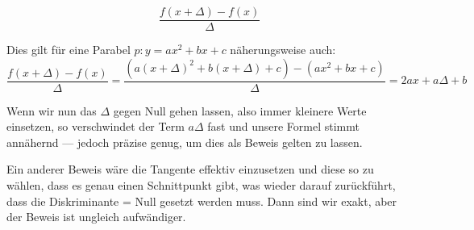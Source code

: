 
$$\frac{f(x+\Delta) - f(x)}{\Delta}$$

Dies gilt für eine Parabel $p: y=ax^2+bx+c$ näherungsweise auch:
$$\frac{f(x+\Delta)-f(x)}{\Delta} = \frac{(a(x+\Delta)^2 + b(x+\Delta)
  + c) - (ax^2 + bx +c)}{\Delta}=2ax+a\Delta+b$$

Wenn wir nun das $\Delta$ gegen Null gehen lassen, also immer kleinere
Werte einsetzen, so verschwindet der Term $a\Delta$ fast und unsere
Formel stimmt annähernd --- jedoch präzise genug, um dies als Beweis
gelten zu lassen.

Ein anderer Beweis wäre die Tangente effektiv einzusetzen und diese so
zu wählen, dass es genau einen Schnittpunkt gibt, was wieder darauf
zurückführt, dass die Diskriminante = Null gesetzt werden muss. Dann
sind wir exakt, aber der Beweis ist ungleich aufwändiger.
\newpage

